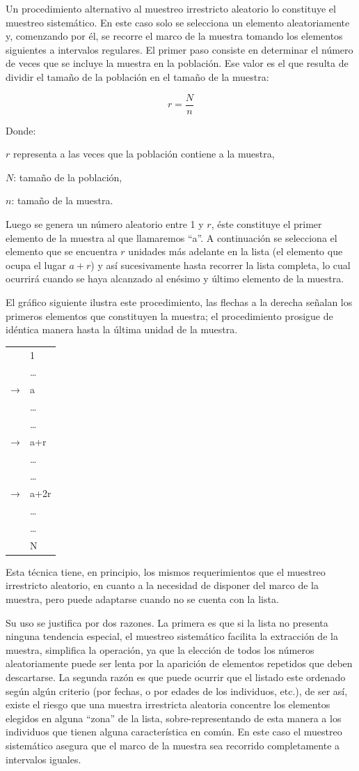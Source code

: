 \documentclass[]{article}
\begin{document}
Un procedimiento alternativo al muestreo irrestricto aleatorio lo constituye el muestreo sistemático. En este caso solo se selecciona un elemento aleatoriamente y, comenzando por él, se recorre el marco de la muestra tomando los elementos siguientes a intervalos regulares. El primer paso consiste en determinar el número de veces que se incluye la muestra en la población. Ese valor es el que resulta de dividir el tamaño de la población en el tamaño de la muestra:

\[r = \frac{N}{n}\]

Donde:

\(r\) representa a las veces que la población contiene a la muestra,

\(N\): tamaño de la población,

\(n\): tamaño de la muestra.

Luego se genera un número aleatorio entre 1 y \(r\), éste constituye el
primer elemento de la muestra al que llamaremos ``a''. A continuación se
selecciona el elemento que se encuentra \(r\) unidades más adelante en la lista (el elemento que ocupa el lugar \(a+r\)) y así sucesivamente hasta recorrer la lista completa, lo cual ocurrirá cuando se haya alcanzado al
enésimo y último elemento de la muestra.

El gráfico siguiente ilustra este procedimiento, las flechas a la
derecha señalan los primeros elementos que constituyen la muestra; el
procedimiento prosigue de idéntica manera hasta la última unidad de la
muestra.

\begin{longtable}[]{@{}ll@{}}
\toprule
\endhead
& 1\tabularnewline
& \ldots{}\tabularnewline
→ & a\tabularnewline
& \ldots{}\tabularnewline
& \ldots{}\tabularnewline
→ & a+r\tabularnewline
& \ldots{}\tabularnewline
& \ldots{}\tabularnewline
→ & a+2r\tabularnewline
& \ldots{}\tabularnewline
& \ldots{}\tabularnewline
& N\tabularnewline
\bottomrule
\end{longtable}

Esta técnica tiene, en principio, los mismos requerimientos que el
muestreo irrestricto aleatorio, en cuanto a la necesidad de disponer del
marco de la muestra, pero puede adaptarse cuando no se cuenta con la
lista.

Su uso se justifica por dos razones. La primera es que si la lista no
presenta ninguna tendencia especial, el muestreo sistemático facilita la
extracción de la muestra, simplifica la operación, ya que la elección de
todos los números aleatoriamente puede ser lenta por la aparición de
elementos repetidos que deben descartarse. La segunda razón es que puede
ocurrir que el listado este ordenado según algún criterio (por fechas, o
por edades de los individuos, etc.), de ser así, existe el riesgo que
una muestra irrestricta aleatoria concentre los elementos elegidos en
alguna ``zona'' de la lista, sobre-representando de esta manera a los
individuos que tienen alguna característica en común. En este caso el
muestreo sistemático asegura que el marco de la muestra sea recorrido
completamente a intervalos iguales.
\end{document}

